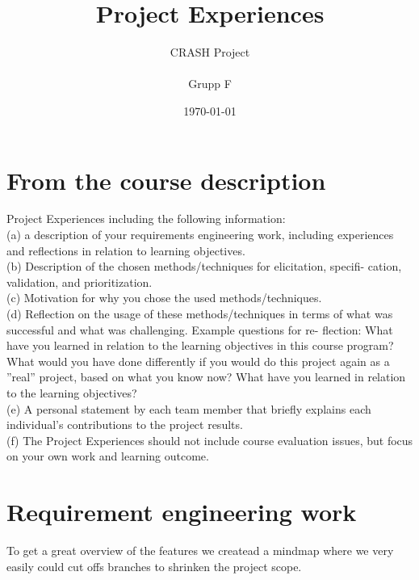 \documentclass[10pt]{article}
\title{Project Experiences}
\author{CRASH Project
\\
\\ Grupp F}
\date{}
\begin{document}
\date{\today}
\begin{titlepage}
\clearpage
  \maketitle
\thispagestyle{empty}

\end{titlepage}


\tableofcontents
\thispagestyle{empty}
\newpage
{}

\section{From the course description}
\sloppy
\noindent
Project Experiences including the following information:
\\(a) a description of your requirements engineering work, including experiences
and reflections in relation to learning objectives.
\\(b) Description of the chosen methods/techniques for elicitation, specifi-
cation, validation, and prioritization.
\\(c) Motivation for why you chose the used methods/techniques.
\\(d) Reflection on the usage of these methods/techniques in terms of what
was successful and what was challenging. Example questions for re-
flection: What have you learned in relation to the learning objectives
in this course program? What would you have done differently if you
would do this project again as a ”real” project, based on what you know
now? What have you learned in relation to the learning objectives?
\\(e) A personal statement by each team member that briefly explains each
individual’s contributions to the project results.
\\(f) The Project Experiences should not include course evaluation issues,
but focus on your own work and learning outcome.
\newline

\section{Requirement engineering work}
\sloppy
\noindent To get a great overview of the features we createad a mindmap where we very easily could cut offs branches to shrinken the project scope.
\end{document}
